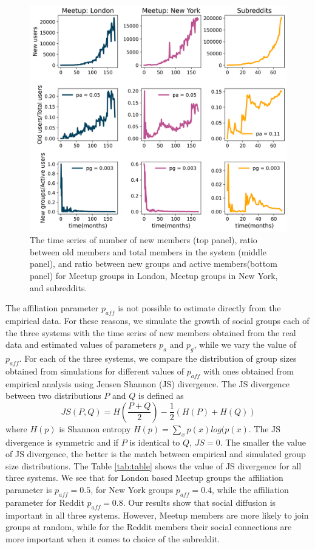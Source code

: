 \begin{figure}[h]
	\centering
	\includegraphics[width=0.8\linewidth]{Figures/figures/Fig3.png}
	\caption[The estimation of the model parameters for groups growth model.]{The time series of number of new members (top panel), ratio between old members and total members in the system (middle panel), and ratio between new groups and active members(bottom panel) for Meetup groups in London,  Meetup groups in New York, and subreddits. }
	\label{fig:fig5}
\end{figure}

The affiliation parameter $p_{aff}$ is not possible to estimate directly from the empirical data. For these reasons, we simulate the growth of social groups each of the three systems with the time series of new members obtained from the real data and estimated values of parameters $p_a$ and $p_g$, while we vary the value of $p_{aff}$. For each of the three systems, we compare the distribution of group sizes obtained from simulations for different values of $p_{aff}$ with ones obtained from empirical analysis using Jensen Shannon (JS) divergence. The JS divergence \cite{jsdivergence} between two distributions $P$ and $Q$ is defined as 
\begin{equation}
JS(P, Q) = H\left(\frac{P+Q}{2}\right) - \frac{1}{2}\left(H(P)+H(Q)\right) \label{eq2}
\end{equation}
where $H(p)$ is Shannon entropy $H(p)=\sum_x p(x)log(p(x)$. The JS divergence is symmetric and if $P$ is identical to $Q$, $JS=0$. The smaller the value of JS divergence, the better is the match between empirical and simulated group size distributions. The Table \ref{tab:table} shows the value of JS divergence for all three systems. We see that for London based Meetup groups the affiliation parameter is $p_{aff}=0.5$, for New York groups $p_{aff}=0.4$, while the affiliation parameter for Reddit $p_{aff}=0.8$. Our results show that social diffusion is important in all three systems. However, Meetup members are more likely to join groups at random, while for the Reddit members their social connections are more important when it comes to choice of the subreddit.  


